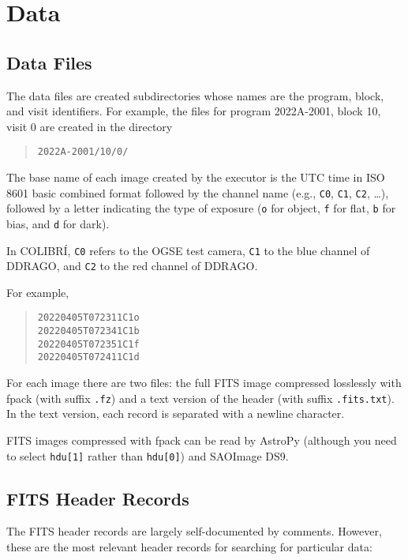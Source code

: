 \chapter{Data}

\section{Data Files}

The data files are created subdirectories whose names are the program, block, and visit identifiers. For example, the files for program 2022A-2001, block 10, visit 0 are created in the directory

\begin{quote}
\verb|2022A-2001/10/0/|
\end{quote}

The base name of each image created by the executor is the UTC time in ISO 8601 basic combined format followed by the channel name (e.g., \verb|C0|, \verb|C1|, \verb|C2|, \ldots), followed by a letter indicating the type of exposure (\verb|o| for object, \verb|f| for flat, \verb|b| for bias, and \verb|d| for dark). 

In COLIBRÍ, \verb|C0| refers to the OGSE test camera, \verb|C1| to the blue channel of DDRAGO, and \verb|C2| to the red channel of DDRAGO.

For example,

\begin{quote}
\verb|20220405T072311C1o|\\
\verb|20220405T072341C1b|\\
\verb|20220405T072351C1f|\\
\verb|20220405T072411C1d|
\end{quote}

For each image there are two files: the full FITS image compressed losslessly with fpack (with suffix \verb|.fz|) and a text version of the header (with suffix \verb|.fits.txt|). In the text version, each record is separated with a newline character.

FITS images compressed with fpack can be read by AstroPy (although you need to select \verb|hdu[1]| rather than \verb|hdu[0]|) and SAOImage DS9.

\section{FITS Header Records}

The FITS header records are largely self-documented by comments. However, these are the most relevant header records for searching for particular data:

